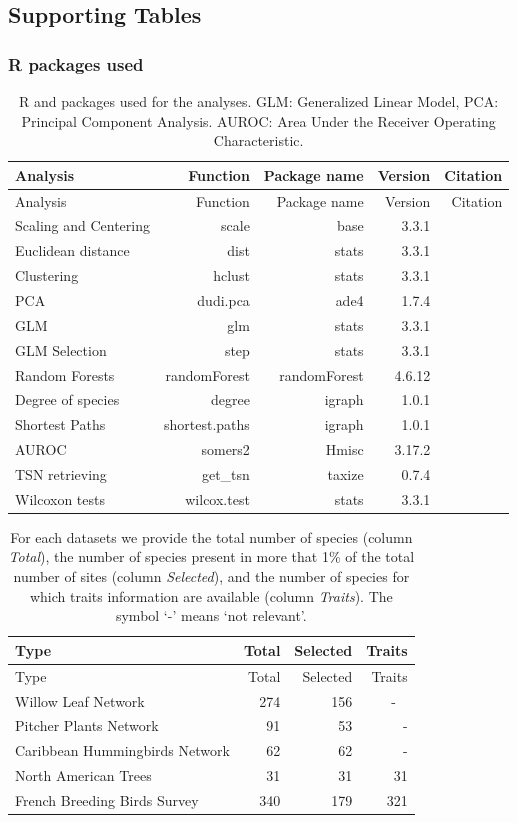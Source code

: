 \subsection{Supporting Tables}\label{supporting-tables}

\subsubsection{R packages used}\label{r-packages-used}

\begin{longtable}[]{@{}lrrrr@{}}
\caption{R and packages used for the analyses. GLM: Generalized Linear
Model, PCA: Principal Component Analysis. AUROC: Area Under the Receiver
Operating Characteristic. \label{tbl:rpkges}}\tabularnewline
\toprule
Analysis & Function & Package name & Version & Citation\tabularnewline
\midrule
\endfirsthead
\toprule
Analysis & Function & Package name & Version & Citation\tabularnewline
\midrule
\endhead
Scaling and Centering & scale & base & 3.3.1 &
\citet{Rcoreteam2015}\tabularnewline
Euclidean distance & dist & stats & 3.3.1 &
\citet{Rcoreteam2015}\tabularnewline
Clustering & hclust & stats & 3.3.1 &
\citet{Rcoreteam2015}\tabularnewline
PCA & dudi.pca & ade4 & 1.7.4 & \citet{Dray2007}\tabularnewline
GLM & glm & stats & 3.3.1 & \citet{Rcoreteam2015}\tabularnewline
GLM Selection & step & stats & 3.3.1 &
\citet{Rcoreteam2015}\tabularnewline
Random Forests & randomForest & randomForest & 4.6.12 &
\citet{Liaw2002}\tabularnewline
Degree of species & degree & igraph & 1.0.1 &
\citet{Csardi2006}\tabularnewline
Shortest Paths & shortest.paths & igraph & 1.0.1 &
\citet{Csardi2006}\tabularnewline
AUROC & somers2 & Hmisc & 3.17.2 & \citet{HarrellJr2016}\tabularnewline
TSN retrieving & get\_tsn & taxize & 0.7.4 &
\citet{Chamberlain2013}\tabularnewline
Wilcoxon tests & wilcox.test & stats & 3.3.1 &
\citet{Rcoreteam2015}\tabularnewline
\bottomrule
\end{longtable}

\begin{longtable}[]{@{}lrrr@{}}
\caption{For each datasets we provide the total number of species
(column \emph{Total}), the number of species present in more that 1\% of
the total number of sites (column \emph{Selected}), and the number of
species for which traits information are available (column
\emph{Traits}). The symbol `-' means `not relevant'.
\label{tbl:numsp}}\tabularnewline
\toprule
Type & Total & Selected & Traits\tabularnewline
\midrule
\endfirsthead
\toprule
Type & Total & Selected & Traits\tabularnewline
\midrule
\endhead
Willow Leaf Network & 274 & 156 & - ~\tabularnewline
Pitcher Plants Network & 91 & 53 & -\tabularnewline
Caribbean Hummingbirds Network & 62 & 62 & -\tabularnewline
North American Trees & 31 & 31 & 31\tabularnewline
French Breeding Birds Survey & 340 & 179 & 321\tabularnewline
\bottomrule
\end{longtable}


